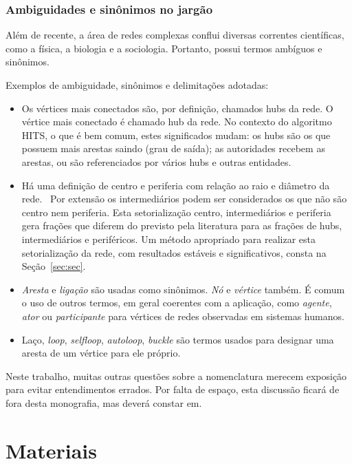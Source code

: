\documentclass[a4paper,openright,12pt]{report} %
\begin{document}
\subsection{Ambiguidades e sinônimos no jargão}\label{sec:jar}
Além de recente, a área de redes complexas conflui diversas 
correntes científicas, como a física, a biologia e a sociologia.
Portanto, possui termos ambíguos e sinônimos.

Exemplos de ambiguidade, sinônimos e delimitações adotadas:
\begin{itemize}
    \item Os vértices mais conectados são, por definição, chamados hubs da rede. O vértice mais conectado é chamado hub da rede. No contexto do algoritmo HITS, o que é bem comum, estes significados mudam: os hubs são os que possuem mais arestas saindo (grau de saída); as autoridades recebem as arestas, ou são referenciados por vários hubs e outras entidades.
    \item Há uma definição de centro e periferia com relação ao raio e diâmetro da rede.~\cite{newmanBook,networkX}
        Por extensão os intermediários podem ser considerados os que não são centro nem periferia.
        Esta setorialização centro, intermediários e periferia gera frações que diferem do previsto pela literatura para as frações de hubs, intermediários e periféricos.
        Um método apropriado para realizar esta setorialização da rede, com resultados estáveis e significativos, consta na Seção~\ref{sec:sec}.
    \item \emph{Aresta} e \emph{ligação} são usadas como sinônimos. \emph{Nó} e \emph{vértice} também. É comum o uso de outros termos, em geral coerentes com a aplicação, como \emph{agente}, \emph{ator} ou \emph{participante} para vértices de redes observadas em sistemas humanos.
    \item Laço, \emph{loop}, \emph{selfloop}, \emph{autoloop}, \emph{buckle} são termos usados para designar uma aresta de um vértice para ele próprio.
\end{itemize}


Neste trabalho, muitas outras questões sobre a nomenclatura
merecem exposição para evitar entendimentos errados. Por falta
de espaço, esta discussão ficará de fora desta monografia, mas deverá 
constar em.~\cite{gradus}

\chapter{Materiais}\label{sec:mat}
\end{document}
